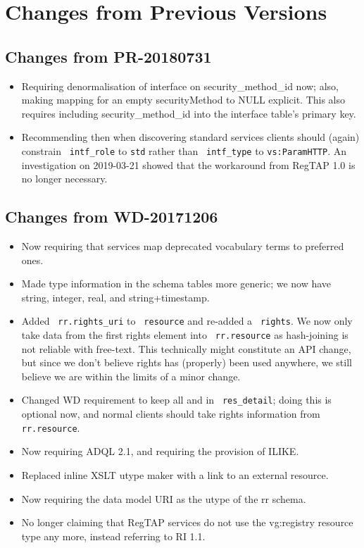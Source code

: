 \documentclass[11pt,a4paper]{ivoa}
\newcommand{\rtent}[1]{\texttt{\color{rtcolor} #1}}
\begin{document}
\section{Changes from Previous Versions}

\label{changes}

\subsection{Changes from PR-20180731}

\begin{itemize}
\item Requiring denormalisation of interface on security\_method\_id
now; also, making mapping for an empty securityMethod to NULL explicit.
This also requires including security\_method\_id into the interface
table's primary key.
\item Recommending then when discovering standard services clients
should (again) constrain \rtent{intf\_role} to \verb|std| rather than
\rtent{intf\_type} to \verb|vs:ParamHTTP|.  An investigation on 2019-03-21 showed that the
workaround from RegTAP 1.0 is no longer necessary.
\end{itemize}

\subsection{Changes from WD-20171206}

\begin{itemize}
\item Now requiring that services map deprecated vocabulary terms to
preferred ones.
\item Made type information in the schema tables more generic; we now
have string, integer, real, and string+timestamp.
\item Added \rtent{rr.rights\_uri} to \rtent{resource} and re-added a
\rtent{rights}.  We now only take data from the first rights element
into \rtent{rr.resource} as hash-joining is not reliable with free-text.
This technically might constitute an API change, but since we don't
believe rights has (properly) been used anywhere, we still believe we are
within the limits of a minor change.
\item  Changed WD requirement to keep all  and
 in \rtent{res\_detail}; doing this is optional now,
and normal clients should take rights information from
\rtent{rr.resource}.
\item Now requiring ADQL 2.1, and requiring the provision of ILIKE.
\item Replaced inline XSLT utype maker with a link to an external
resource.
\item Now requiring the data model URI as the utype of the rr schema.
\item No longer claiming that RegTAP services do not use the vg:registry
resource type any more, instead referring to RI 1.1.
\end{itemize}
\end{document}
